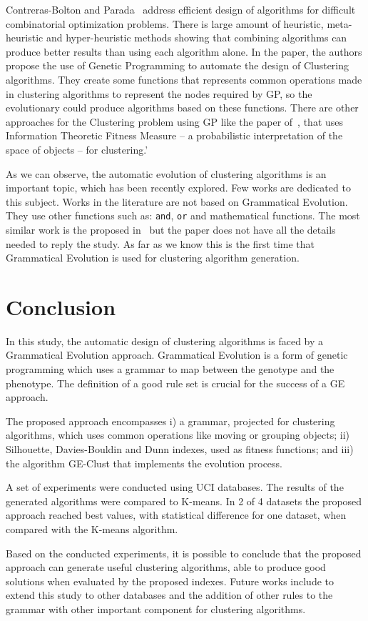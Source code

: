 \documentclass[conference]{IEEEtran}
\begin{document}
	Contreras-Bolton and Parada~\cite{bolton2015optimizing} address efficient design of algorithms for difficult combinatorial optimization problems. There is large amount of heuristic, meta-heuristic and hyper-heuristic methods showing that combining algorithms can produce better results than using each algorithm alone. In the paper, the authors propose the use of Genetic Programming to automate the design of Clustering algorithms. They create some functions that represents common operations made in clustering algorithms to represent the nodes required by GP, so the evolutionary could produce algorithms based on these functions. There are other approaches for the Clustering problem using GP like the paper of~\cite{boric2007genetic}, that uses Information Theoretic Fitness Measure -- a probabilistic interpretation of the space of objects -- for clustering.'
	
	As we can observe, the automatic evolution of clustering algorithms is an important topic, which has been recently explored. Few works are dedicated to this subject. Works in the literature are not based on Grammatical Evolution. They use other functions such as: \texttt{and}, \texttt{or} and mathematical functions. The most similar work is the proposed in~\cite{bolton2015optimizing} but the paper does not have all the details needed to reply the study.  As far as we know this is the first time that Grammatical Evolution is used for clustering algorithm generation. 
	
	
	\section{Conclusion}
	\label{sec:conclusion}
	
	
	In this study, the automatic design of clustering algorithms is faced by a Grammatical Evolution approach. Grammatical Evolution is a form of genetic programming which uses a grammar to map between the genotype and the phenotype. The definition of a good rule set is crucial for the success of a GE approach. 
	
	The proposed approach encompasses i) a grammar,  projected for clustering algorithms, which uses common operations like moving or grouping objects; ii)  Silhouette, Davies-Bouldin and Dunn indexes, used as fitness functions; and iii) the algorithm GE-Clust that implements the evolution process. 
	
	A set of experiments were conducted using UCI databases. The results of the generated algorithms were compared to K-means. In 2 of 4 datasets the proposed approach reached best values, with statistical difference for one dataset, when compared with the K-means algorithm.
	
	Based on the conducted experiments, it is possible to conclude that the proposed approach can generate useful clustering algorithms, able to produce good solutions when evaluated by the proposed indexes. Future works include to extend this study to other databases and the addition of other rules to the grammar with other important component for clustering algorithms.
	
	
	
	
	
\end{document}
